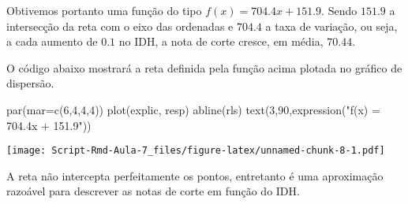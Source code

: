 \documentclass[
]{article}
\newenvironment{Shaded}{\begin{snugshade}}{\end{snugshade}}
\newcommand{\AttributeTok}[1]{\textcolor[rgb]{0.77,0.63,0.00}{#1}}
\newcommand{\DecValTok}[1]{\textcolor[rgb]{0.00,0.00,0.81}{#1}}
\newcommand{\FunctionTok}[1]{\textcolor[rgb]{0.00,0.00,0.00}{#1}}
\newcommand{\NormalTok}[1]{#1}
\newcommand{\StringTok}[1]{\textcolor[rgb]{0.31,0.60,0.02}{#1}}
\begin{document}
Obtivemos portanto uma função do tipo \(f(x) = 704.4x + 151.9\). Sendo
\(151.9\) a intersecção da reta com o eixo das ordenadas e \(704.4\) a
taxa de variação, ou seja, a cada aumento de \(0.1\) no IDH, a nota de
corte cresce, em média, \(70.44\).

O código abaixo mostrará a reta definida pela função acima plotada no
gráfico de dispersão.

\begin{Shaded}
\begin{Highlighting}[]
\FunctionTok{par}\NormalTok{(}\AttributeTok{mar=}\FunctionTok{c}\NormalTok{(}\DecValTok{6}\NormalTok{,}\DecValTok{4}\NormalTok{,}\DecValTok{4}\NormalTok{,}\DecValTok{4}\NormalTok{))}
\FunctionTok{plot}\NormalTok{(explic, resp)}
\FunctionTok{abline}\NormalTok{(rls)}
\FunctionTok{text}\NormalTok{(}\DecValTok{3}\NormalTok{,}\DecValTok{90}\NormalTok{,}\FunctionTok{expression}\NormalTok{(}\StringTok{"f(x) = 704.4x + 151.9"}\NormalTok{))}
\end{Highlighting}
\end{Shaded}

\texttt{[image: Script-Rmd-Aula-7\_files/figure-latex/unnamed-chunk-8-1.pdf]}

A reta não intercepta perfeitamente os pontos, entretanto é uma
aproximação razoável para descrever as notas de corte em função do IDH.
\end{document}
